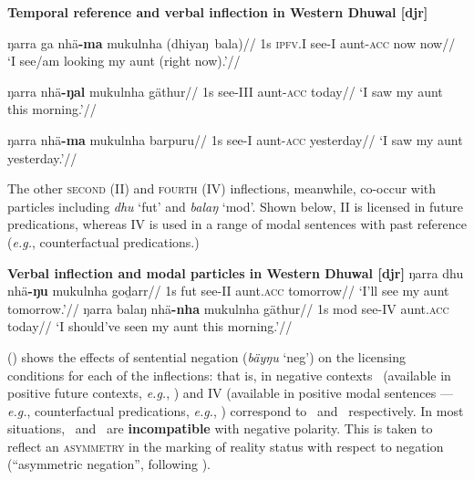 \pex \textbf{Temporal reference and verbal inflection in Western Dhuwal [\gls{djr}]}

\a\begingl\gla {}ŋarra ga nhä\textbf{-ma} mukulnha (dhiyaŋ~bala)//
\glb  1s \textsc{ipfv.\gls{I}} see-\gls{I} aunt-\textsc{acc} now now//
\glft`I see/am looking my aunt (right now).'//\endgl


\a\begingl\gla  {}ŋarra nhä\textbf{-ŋal} mukulnha gäthur//
\glb 1s see-\gls{III} aunt-\textsc{acc} today//
\glft`I saw my aunt this morning.'//\endgl 

\a\begingl\gla {}ŋarra nhä\textbf{-ma} mukulnha barpuru//
\glb 1s see-\gls{I} aunt-\textsc{acc} yesterday//
\glft`I saw my aunt yesterday.'//\endgl\xe


The other \textsc{second} (\gls{II}) and \textsc{fourth} (\gls{IV}) inflections, meanwhile, co-occur with particles including \textit{dhu} `\gls{fut}' and \textit{balaŋ} `\gls{mod}'. Shown below, \gls{II} is licensed in future predications, whereas \gls{IV} is used in a range of modal sentences with past reference (\textit{e.g.}, counterfactual predications.) 


\pex\textbf{Verbal inflection and modal particles in Western Dhuwal [\gls{djr}]}
\a\begingl
\gla {}ŋarra dhu nhä\textbf{-ŋu} mukulnha goḏarr//
\glb 1s \gls{fut} see-\gls{II} aunt.\textsc{acc} tomorrow//
\glft`I'll see my aunt tomorrow.'//\endgl
\a\begingl\gla {}ŋarra balaŋ nhä\textbf{-nha} mukulnha gäthur//
\glb 1s \gls{mod} see-\gls{IV} aunt.\textsc{acc} today//
\glft`I should've seen my aunt this morning.'//\endgl
\xe


() shows the effects of sentential negation (\textit{bäyŋu} `\gls{neg}') on the licensing conditions for each of the inflections: that is, in negative contexts \II\ (available in positive future contexts, \textit{e.g.}, ) and \gls{IV} (available in positive modal sentences --- \textit{e.g.}, counterfactual predications, \textit{e.g.}, ) correspond to \I\ and \III\ respectively. In most situations, \I~and \III~are \textbf{incompatible} with negative polarity. This is taken to reflect an \textsc{asymmetry} in the marking of reality status with respect to negation (``asymmetric negation'', following \citealp{Miestamo2005}).

